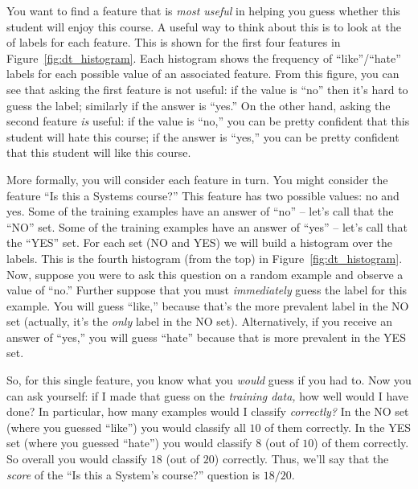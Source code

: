 You want to find a feature that is \emph{most useful} in helping you
guess whether this student will enjoy this course.
A useful way to think about this is to look at the 
of labels for each feature.
This is shown for the first four features
in Figure~\ref{fig:dt_histogram}.  Each histogram shows the frequency
of ``like''/``hate'' labels for each possible value of an associated
feature.  From this figure, you can see that asking the first feature
is not useful: if the value is ``no'' then it's hard to guess the
label; similarly if the answer is ``yes.''  On the other hand, asking
the second feature \emph{is} useful: if the value is ``no,'' you can
be pretty confident that this student will hate this course; if the
answer is ``yes,'' you can be pretty confident that this student will
like this course.

More formally, you will consider each feature in turn.  You might
consider the feature ``Is this a Systems course?''  This feature has
two possible values: no and yes.  Some of the training examples have an
answer of ``no'' -- let's call that the ``NO'' set.  Some of the
training examples have an answer of ``yes'' -- let's call that the
``YES'' set.  For each set (NO and YES) we will build a histogram over
the labels.  This is the fourth histogram (from the top) in
Figure~\ref{fig:dt_histogram}.  Now, suppose you were to ask this
question on a random example and observe a value of ``no.''  Further
suppose that you must \emph{immediately} guess the label for this
example.  You will guess ``like,'' because that's the more prevalent
label in the NO set (actually, it's the \emph{only} label in the NO
set).  Alternatively, if you receive an answer of ``yes,'' you will
guess ``hate'' because that is more prevalent in the YES set.

So, for this single feature, you know what you \emph{would} guess if
you had to.  Now you can ask yourself: if I made that guess on the
\emph{training data,} how well would I have done?  In particular, how
many examples would I classify \emph{correctly?}  In the NO set (where
you guessed ``like'') you would classify all $10$ of them correctly.
In the YES set (where you guessed ``hate'') you would classify $8$
(out of $10$) of them correctly.  So overall you would classify $18$
(out of $20$) correctly.  Thus, we'll say that the \emph{score} of the
``Is this a System's course?'' question is $18/20$.

